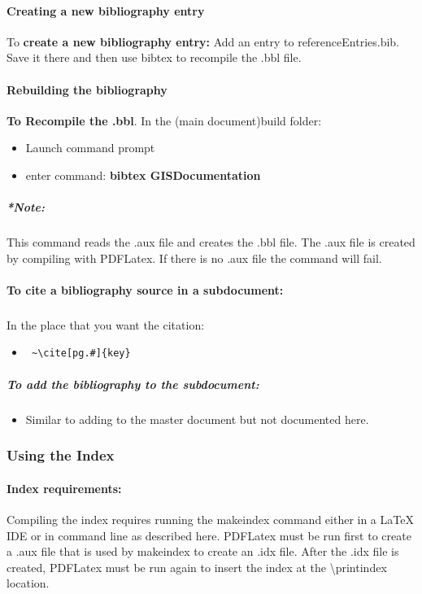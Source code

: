 \documentclass[class=book , crop=false]{standalone}
\begin{document}
\paragraph{Creating a new bibliography entry}
To \textbf{create a new bibliography entry:} Add an entry to referenceEntries.bib.  Save it there and then use bibtex to recompile the .bbl file.
\paragraph{Rebuilding the bibliography}
\textbf{To Recompile the .bbl}.  In the (main document)build folder:
\begin{itemize}
\item Launch command prompt
\item enter command: \textbf{{\large bibtex GISDocumentation}}
\end{itemize}
\subparagraph{*Note:} {\footnotesize This command reads the .aux file and creates the .bbl file.  The .aux file is created by compiling with PDFLatex.  If there is no .aux file the command will fail.}

\paragraph{To cite a bibliography source in a subdocument:} 
\subparagraph{}In the place that you want the citation:
\begin{itemize}
\item \begin{verbatim} ~\cite[pg.#]{key}\end{verbatim}
\end{itemize} 
\subparagraph{To add the bibliography to the subdocument:}
\begin{itemize}
\item Similar to adding to the master document but not documented here.
\end{itemize}


\subsubsection[Using the Index]{{\Large Using the Index}}
\paragraph{Index requirements:}
Compiling the index requires running the makeindex command either in a \LaTeX{} IDE or in command line as described here.  PDFLatex must be run first to create a .aux file that is used by makeindex to create an .idx file.  After the .idx file is created, PDFLatex must be run again to insert the index at the \textbackslash printindex location. 
\end{document}
